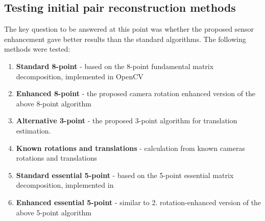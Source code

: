 \subsection{Testing initial pair reconstruction methods} \label{sec:Testin2Views}
The key question to be answered at this point was whether the proposed sensor enhancement gave better results than the standard algorithms.
The following methods were tested:
\begin{enumerate}
\item \textbf{Standard 8-point} - based on the 8-point fundamental matrix decomposition, implemented in OpenCV
\item \textbf{Enhanced 8-point} - the proposed camera rotation enhanced version of the above 8-point algorithm
\item \textbf{Alternative 3-point} - the proposed 3-point algorithm for translation estimation.
\item \textbf{Known rotations and translations} - calculation from known cameras rotations and translations
\item \textbf{Standard essential 5-point} - based on the 5-point essential matrix decomposition, implemented in \cite{website:relativePoseLibrary}
\item \textbf{Enhanced essential 5-point} - similar to 2. rotation-enhanced version of the above 5-point algorithm
\end{enumerate}
